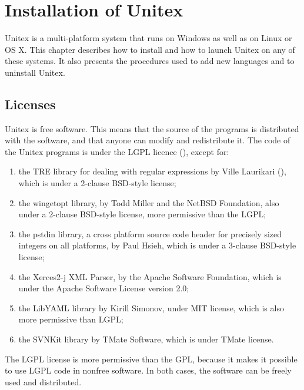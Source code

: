 \chapter{Installation of Unitex}
\label{chap-install}

Unitex is a multi-platform system that runs on Windows as well as on Linux or
OS X. This chapter describes how to install and how to launch Unitex on any of
these systems. It also presents the procedures used to add new languages and to
uninstall Unitex.

\section{Licenses}
\label{section-licences}
Unitex is free software. This means that the source of the programs is
distributed with the software, and that anyone can modify and redistribute it.
The code of the Unitex programs is under the LGPL licence (\cite{LGPL}), except
for:

\begin{enumerate}
\item the TRE library for dealing with regular expressions by Ville Laurikari
(\cite{TRE}), which is under a 2-clause BSD-style license;

\item the wingetopt library, by Todd Miller and the NetBSD Foundation,
 also under a 2-clause BSD-style license, more permissive than the LGPL;

\item the pstdin library, a cross platform source code header for precisely
sized integers on all platforms, by Paul Hsieh, which is under a
3-clause BSD-style license; 

\item the Xerces2-j XML Parser, by the Apache Software Foundation, which is under
the Apache Software License version 2.0;

\item  the LibYAML library by Kirill Simonov, under MIT license, which is 
also more permissive than LGPL;

\item the SVNKit library by TMate Software, which is under TMate license.
\end{enumerate}

\noindent The LGPL license is more permissive than the GPL,
because it makes it possible to use LGPL code in nonfree software. 
In both cases, the software can be freely used and distributed.

